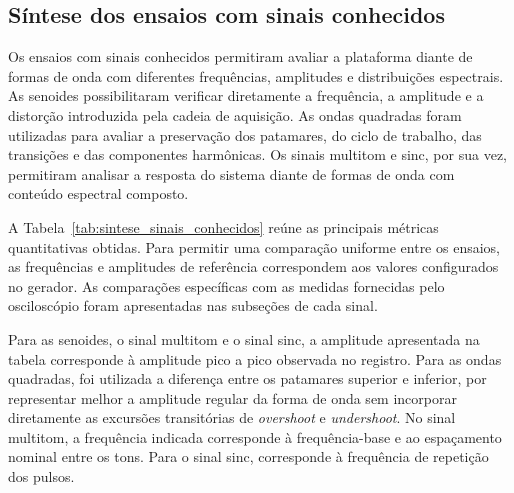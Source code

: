 \documentclass[a4paper,12pt]{fcte}
\begin{document}
\subsection{Síntese dos ensaios com sinais conhecidos}
\label{subsec:sintese_sinais_conhecidos}

Os ensaios com sinais conhecidos permitiram avaliar a plataforma diante de formas de onda com diferentes frequências, amplitudes e distribuições espectrais. As senoides possibilitaram verificar diretamente a frequência, a amplitude e a distorção introduzida pela cadeia de aquisição. As ondas quadradas foram utilizadas para avaliar a preservação dos patamares, do ciclo de trabalho, das transições e das componentes harmônicas. Os sinais multitom e sinc, por sua vez, permitiram analisar a resposta do sistema diante de formas de onda com conteúdo espectral composto.

A Tabela~\ref{tab:sintese_sinais_conhecidos} reúne as principais métricas quantitativas obtidas. Para permitir uma comparação uniforme entre os ensaios, as frequências e amplitudes de referência correspondem aos valores configurados no gerador. As comparações específicas com as medidas fornecidas pelo osciloscópio foram apresentadas nas subseções de cada sinal.

Para as senoides, o sinal multitom e o sinal sinc, a amplitude apresentada na tabela corresponde à amplitude pico a pico observada no registro. Para as ondas quadradas, foi utilizada a diferença entre os patamares superior e inferior, por representar melhor a amplitude regular da forma de onda sem incorporar diretamente as excursões transitórias de \textit{overshoot} e \textit{undershoot}. No sinal multitom, a frequência indicada corresponde à frequência-base e ao espaçamento nominal entre os tons. Para o sinal sinc, corresponde à frequência de repetição dos pulsos.
\end{document}
